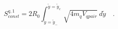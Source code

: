 \begin{equation}
S^{q,1}_{const}=2R_0\int^{\tilde{y}=\tilde{y}_c}_{\tilde{y}=\tilde{y}_-}\sqrt{4
m_q V_{qpair}}~d\tilde{y}\quad.
\end{equation}

